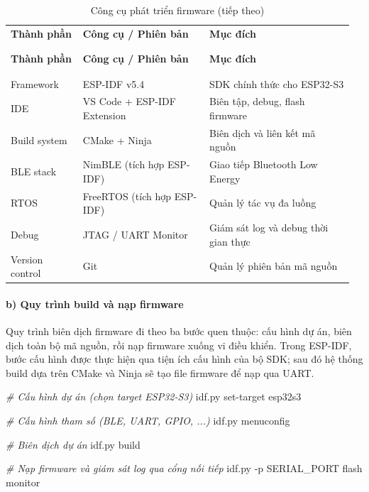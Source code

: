 \documentclass[a4paper]{extarticle}
\newenvironment{Shaded}{}{}
\newcommand{\AttributeTok}[1]{\textcolor[rgb]{0.49,0.56,0.16}{#1}}
\newcommand{\CommentTok}[1]{\textcolor[rgb]{0.38,0.63,0.69}{\textit{#1}}}
\newcommand{\ExtensionTok}[1]{#1}
\newcommand{\NormalTok}[1]{#1}
\newcommand{\thesissettableid}[2]{%
  \renewcommand{\thetable}{#1}%
  \renewcommand{\theHtable}{#2}%
}
\begin{document}
{\thesissettableid{4.5}{tab-ch4-cong-cu-phat-trien-firmware}
\def\LTcaptype{table}
\begin{longtable}{|L{0.208\linewidth}|L{0.355\linewidth}|L{0.401\linewidth}|}
\caption{Công cụ phát triển firmware}\label{tab:ch4-cong-cu-phat-trien-firmware}\\
\hline \textbf{Thành phần} & \textbf{Công cụ / Phiên bản} & \textbf{Mục đích} \\
\\\hline
\endfirsthead
\caption[]{Công cụ phát triển firmware (tiếp theo)}\\
\hline \textbf{Thành phần} & \textbf{Công cụ / Phiên bản} & \textbf{Mục đích} \\
\\\hline
\endhead
\\\hline
\endfoot
\endlastfoot
Framework & ESP-IDF v5.4 & SDK chính thức cho ESP32-S3 \\\hline
IDE & VS Code + ESP-IDF Extension & Biên tập, debug, flash firmware \\\hline
Build system & CMake + Ninja & Biên dịch và liên kết mã nguồn \\\hline
BLE stack & NimBLE (tích hợp ESP-IDF) & Giao tiếp Bluetooth Low
Energy \\\hline
RTOS & FreeRTOS (tích hợp ESP-IDF) & Quản lý tác vụ đa luồng \\\hline
Debug & JTAG / UART Monitor & Giám sát log và debug thời gian thực \\\hline
Version control & Git & Quản lý phiên bản mã nguồn \\\hline
\end{longtable}
}


\paragraph{b) Quy trình build và nạp
firmware}\label{b-quy-truxecnh-build-vuxe0-nux1ea1p-firmware}

Quy trình biên dịch firmware đi theo ba bước quen thuộc: cấu hình dự án,
biên dịch toàn bộ mã nguồn, rồi nạp firmware xuống vi điều khiển. Trong
ESP-IDF, bước cấu hình được thực hiện qua tiện ích cấu hình của bộ SDK;
sau đó hệ thống build dựa trên CMake và Ninja sẽ tạo file firmware để
nạp qua UART.

\begin{Shaded}
\begin{Highlighting}[]
\CommentTok{\# Cấu hình dự án (chọn target ESP32{-}S3)}
\ExtensionTok{idf.py}\NormalTok{ set{-}target esp32s3}

\CommentTok{\# Cấu hình tham số (BLE, UART, GPIO, ...)}
\ExtensionTok{idf.py}\NormalTok{ menuconfig}

\CommentTok{\# Biên dịch dự án}
\ExtensionTok{idf.py}\NormalTok{ build}

\CommentTok{\# Nạp firmware và giám sát log qua cổng nối tiếp}
\ExtensionTok{idf.py} \AttributeTok{{-}p}\NormalTok{ SERIAL\_PORT flash monitor}
\end{Highlighting}
\end{Shaded}
\end{document}
